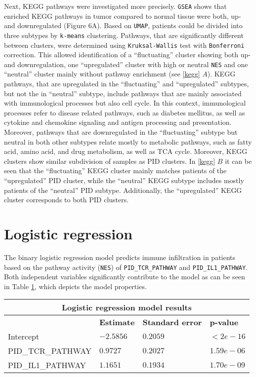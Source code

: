 \documentclass[
  parskip,
  oneside]{scrreprt}
\begin{document}
Next, KEGG pathways were investigated more precisely. \texttt{GSEA}
shows that enriched KEGG pathways in tumor compared to normal tissue
were both, up- and downregulated (Figure 6A). Based on \texttt{UMAP},
patients could be divided into three subtypes by \texttt{k-means}
clustering. Pathways, that are significantly different between clusters,
were determined using \texttt{Kruksal-Wallis} test with
\texttt{Bonferroni} correction. This allowed identification of a
``fluctuating'' cluster showing both up- and downregulation, one
``upregulated'' cluster with high or neutral \texttt{NES} and one
``neutral'' cluster mainly without pathway enrichment (see \cref{kegg}
\(A\)). KEGG pathways, that are upregulated in the ``fluctuating'' and
``upregulated'' subtypes, but not the in ``neutral'' subtype, include
pathways that are mainly associated with immunological processes but
also cell cycle. In this context, immunological processes refer to
disease related pathways, such as diabetes mellitus, as well as cytokine
and chemokine signaling and antigen processing and presentation.\\
Moreover, pathways that are downregulated in the ``fluctuating'' subtype
but neutral in both other subtypes relate mostly to metabolic pathways,
such as fatty acid, amino acid, and drug metabolism, as well as TCA
cycle. Moreover, KEGG clusters show similar subdivision of samples as
PID clusters. In \cref{kegg} \(B\) it can be seen that the
``fluctuating'' KEGG cluster mainly matches patients of the
``upregulated'' PID cluster, while the ``neutral'' KEGG subtype includes
mostly patients of the ``neutral'' PID subtype. Additionally, the
``upregulated'' KEGG cluster corresponds to both PID clusters.

\hypertarget{logistic-regression}{%
\section{Logistic regression}\label{logistic-regression}}

The binary logistic regression model predicts immune infiltration in
patients based on the pathway activity (\texttt{NES}) of
\texttt{PID\_TCR\_PATHWAY} and \texttt{PID\_IL1\_PATHWAY}. Both
independent variables significantly contribute to the model as can be
seen in Table \cref{tab}, which depicts the model properties.

\begin{table}[ht]
 \begin{tabular}{ |p{4.5cm}||p{3cm}|p{3cm}|p{3cm}|  }
  \hline
  \multicolumn{4}{|c|}{Logistic regression model results} \\
  \hline
   & \textbf{Estimate} & \textbf{Standard error} & \textbf{p-value}\\
  \hline
  Intercept   &  $-2.5856$  & $0.2059$ &   $<2e-16$\\
  PID\_TCR\_PATHWAY &   $0.9727$  & $0.2027$   & $1.59e-06$\\
  PID\_IL1\_PATHWAY & $1.1651$ & $0.1934$ &  $1.70e-09$\\
 \hline
 \end{tabular}
 \label{tab}
\end{table}
\end{document}
